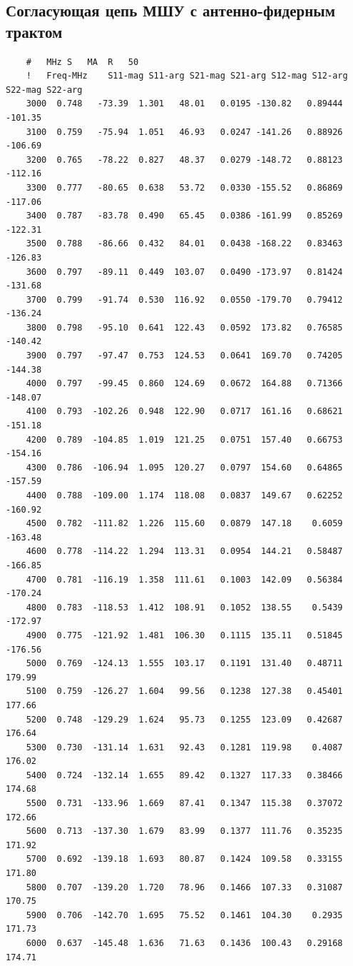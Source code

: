 \documentclass[utf8x, 14pt, oneside, a4paper]{article}
\begin{document}
	\subsection*{Согласующая цепь МШУ с антенно-фидерным трактом}
	\begin{lstlisting}
	#	MHz	S	MA	R	50										
	!	Freq-MHz	S11-mag	S11-arg	S21-mag	S21-arg	S12-mag	S12-arg	S22-mag	S22-arg	
	3000  0.748   -73.39  1.301   48.01   0.0195 -130.82   0.89444  -101.35
	3100  0.759   -75.94  1.051   46.93   0.0247 -141.26   0.88926  -106.69
	3200  0.765   -78.22  0.827   48.37   0.0279 -148.72   0.88123  -112.16
	3300  0.777   -80.65  0.638   53.72   0.0330 -155.52   0.86869  -117.06
	3400  0.787   -83.78  0.490   65.45   0.0386 -161.99   0.85269  -122.31
	3500  0.788   -86.66  0.432   84.01   0.0438 -168.22   0.83463  -126.83
	3600  0.797   -89.11  0.449  103.07   0.0490 -173.97   0.81424  -131.68
	3700  0.799   -91.74  0.530  116.92   0.0550 -179.70   0.79412  -136.24
	3800  0.798   -95.10  0.641  122.43   0.0592  173.82   0.76585  -140.42
	3900  0.797   -97.47  0.753  124.53   0.0641  169.70   0.74205  -144.38
	4000  0.797   -99.45  0.860  124.69   0.0672  164.88   0.71366  -148.07
	4100  0.793  -102.26  0.948  122.90   0.0717  161.16   0.68621  -151.18
	4200  0.789  -104.85  1.019  121.25   0.0751  157.40   0.66753  -154.16
	4300  0.786  -106.94  1.095  120.27   0.0797  154.60   0.64865  -157.59
	4400  0.788  -109.00  1.174  118.08   0.0837  149.67   0.62252  -160.92
	4500  0.782  -111.82  1.226  115.60   0.0879  147.18    0.6059  -163.48
	4600  0.778  -114.22  1.294  113.31   0.0954  144.21   0.58487  -166.85
	4700  0.781  -116.19  1.358  111.61   0.1003  142.09   0.56384  -170.24
	4800  0.783  -118.53  1.412  108.91   0.1052  138.55    0.5439  -172.97
	4900  0.775  -121.92  1.481  106.30   0.1115  135.11   0.51845  -176.56
	5000  0.769  -124.13  1.555  103.17   0.1191  131.40   0.48711   179.99
	5100  0.759  -126.27  1.604   99.56   0.1238  127.38   0.45401   177.66
	5200  0.748  -129.29  1.624   95.73   0.1255  123.09   0.42687   176.64
	5300  0.730  -131.14  1.631   92.43   0.1281  119.98    0.4087   176.02
	5400  0.724  -132.14  1.655   89.42   0.1327  117.33   0.38466   174.68
	5500  0.731  -133.96  1.669   87.41   0.1347  115.38   0.37072   172.66
	5600  0.713  -137.30  1.679   83.99   0.1377  111.76   0.35235   171.92
	5700  0.692  -139.18  1.693   80.87   0.1424  109.58   0.33155   171.80
	5800  0.707  -139.20  1.720   78.96   0.1466  107.33   0.31087   170.75
	5900  0.706  -142.70  1.695   75.52   0.1461  104.30    0.2935   171.73
	6000  0.637  -145.48  1.636   71.63   0.1436  100.43   0.29168   174.71
	\end{lstlisting}
	\pagebreak
	
\end{document}

